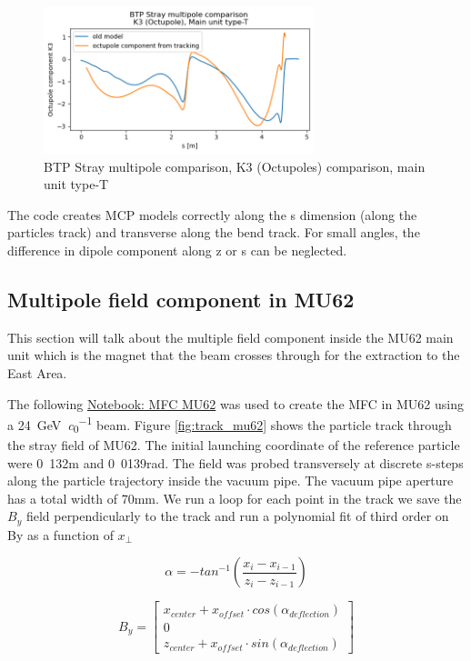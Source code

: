 \begin{figure}[H]
\centering
\includegraphics[width=0.7\textwidth]{02_Simulation/images/mcp_octupoles.png}
\caption{BTP Stray multipole comparison, K3 (Octupoles) comparison, main unit type-T}
\label{fig:mcp_quadrupole}
\end{figure}


The code creates MCP models correctly along the s dimension (along the particles track) and transverse along the bend track. For small angles, the difference in dipole component along z or s can be neglected.

\subsection{Multipole field component in MU62}

This section will talk about the multiple field component inside the MU62 main unit which is the magnet that the beam crosses through for the extraction to the East Area.

The following \href{https://gitlab.cern.ch/eljohnso/acc-models-tls-eliott-fork/-/blob/EliottBranch/ps_extraction/east-fast-extraction/mfc_mu62.ipynb}{Notebook: MFC MU62} was used to create the MFC in MU62 using a \SI{24}{\giga\electronvolt\per\clight} beam. Figure \ref{fig:track_mu62} shows the particle track through the stray field of MU62. The initial launching coordinate of the reference particle were \si{0.132}{m} and \si{0.0139}{rad}. The field was probed transversely at discrete s-steps along the particle trajectory inside the vacuum pipe. The vacuum pipe aperture has a total width of \si{70}{mm}. We run a loop for each point in the track we save the $B_{y}$ field perpendicularly to the track  and run a polynomial fit of third order on By as a function of $x_{\perp}$

$$ \alpha = - tan^{-1}\left(\frac{ x_{i}-x_{i-1} } {z_{i}-z_{i-1}} \right)$$

$$ B_{y} = \begin{bmatrix}  
x_{center} + x_{offset}\cdot cos(\alpha_{deflection}) \\  
0 \\
z_{center} + x_{offset}\cdot sin(\alpha_{deflection})
\end{bmatrix} $$



